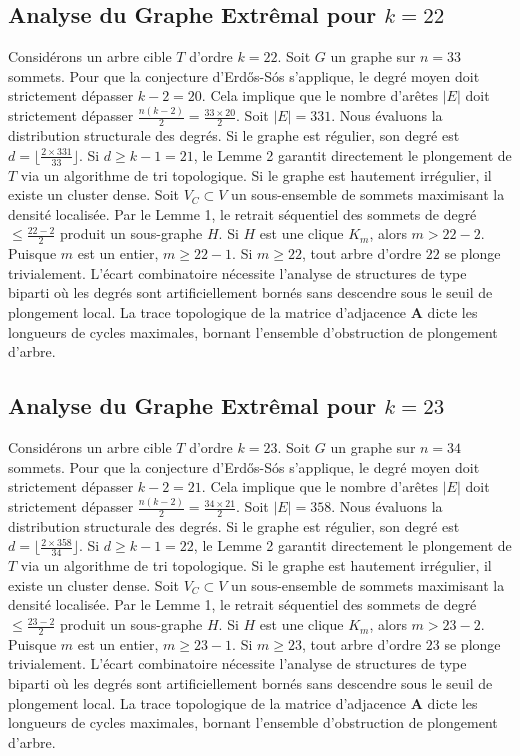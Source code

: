 \documentclass[11pt,a4paper]{article}
\begin{document}
\subsection{Analyse du Graphe Extr\^emal pour $k=22$}
Consid\'erons un arbre cible $T$ d'ordre $k=22$.
Soit $G$ un graphe sur $n=33$ sommets.
Pour que la conjecture d'Erd\H{o}s-S\'os s'applique, le degr\'e moyen doit strictement d\'epasser $k-2 = 20$.
Cela implique que le nombre d'ar\^etes $|E|$ doit strictement d\'epasser $\frac{n(k-2)}{2} = \frac{33 \times 20}{2}$.
Soit $|E| = 331$.
Nous \'evaluons la distribution structurale des degr\'es. Si le graphe est r\'egulier, son degr\'e est $d = \lfloor \frac{2 \times 331}{33} \rfloor$.
Si $d \geq k-1 = 21$, le Lemme 2 garantit directement le plongement de $T$ via un algorithme de tri topologique.
Si le graphe est hautement irr\'egulier, il existe un cluster dense. Soit $V_C \subset V$ un sous-ensemble de sommets maximisant la densit\'e localis\'ee.
Par le Lemme 1, le retrait s\'equentiel des sommets de degr\'e $\leq \frac{22-2}{2}$ produit un sous-graphe $H$.
Si $H$ est une clique $K_{m}$, alors $m > 22-2$. Puisque $m$ est un entier, $m \geq 22-1$. Si $m \geq 22$, tout arbre d'ordre $22$ se plonge trivialement.
L'\'ecart combinatoire n\'ecessite l'analyse de structures de type biparti o\`u les degr\'es sont artificiellement born\'es sans descendre sous le seuil de plongement local. La trace topologique de la matrice d'adjacence $\mathbf{A}$ dicte les longueurs de cycles maximales, bornant l'ensemble d'obstruction de plongement d'arbre.


\subsection{Analyse du Graphe Extr\^emal pour $k=23$}
Consid\'erons un arbre cible $T$ d'ordre $k=23$.
Soit $G$ un graphe sur $n=34$ sommets.
Pour que la conjecture d'Erd\H{o}s-S\'os s'applique, le degr\'e moyen doit strictement d\'epasser $k-2 = 21$.
Cela implique que le nombre d'ar\^etes $|E|$ doit strictement d\'epasser $\frac{n(k-2)}{2} = \frac{34 \times 21}{2}$.
Soit $|E| = 358$.
Nous \'evaluons la distribution structurale des degr\'es. Si le graphe est r\'egulier, son degr\'e est $d = \lfloor \frac{2 \times 358}{34} \rfloor$.
Si $d \geq k-1 = 22$, le Lemme 2 garantit directement le plongement de $T$ via un algorithme de tri topologique.
Si le graphe est hautement irr\'egulier, il existe un cluster dense. Soit $V_C \subset V$ un sous-ensemble de sommets maximisant la densit\'e localis\'ee.
Par le Lemme 1, le retrait s\'equentiel des sommets de degr\'e $\leq \frac{23-2}{2}$ produit un sous-graphe $H$.
Si $H$ est une clique $K_{m}$, alors $m > 23-2$. Puisque $m$ est un entier, $m \geq 23-1$. Si $m \geq 23$, tout arbre d'ordre $23$ se plonge trivialement.
L'\'ecart combinatoire n\'ecessite l'analyse de structures de type biparti o\`u les degr\'es sont artificiellement born\'es sans descendre sous le seuil de plongement local. La trace topologique de la matrice d'adjacence $\mathbf{A}$ dicte les longueurs de cycles maximales, bornant l'ensemble d'obstruction de plongement d'arbre.
\end{document}
